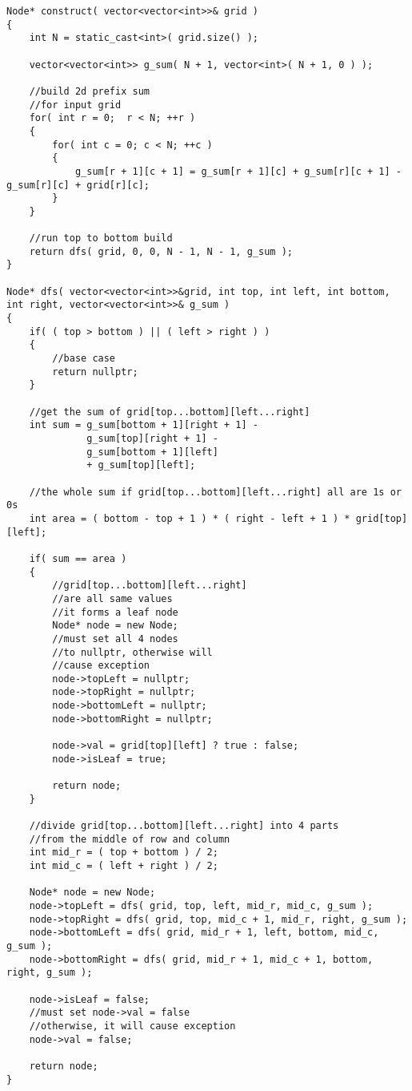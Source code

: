 \setcounter{lstlisting}{0}
\begin{lstlisting}[style=customc, caption={Build From Top To Bottom}]
Node* construct( vector<vector<int>>& grid )
{
    int N = static_cast<int>( grid.size() );

    vector<vector<int>> g_sum( N + 1, vector<int>( N + 1, 0 ) );

    //build 2d prefix sum
    //for input grid
    for( int r = 0;  r < N; ++r )
    {
        for( int c = 0; c < N; ++c )
        {
            g_sum[r + 1][c + 1] = g_sum[r + 1][c] + g_sum[r][c + 1] - g_sum[r][c] + grid[r][c];
        }
    }

    //run top to bottom build
    return dfs( grid, 0, 0, N - 1, N - 1, g_sum );
}

Node* dfs( vector<vector<int>>&grid, int top, int left, int bottom, int right, vector<vector<int>>& g_sum )
{
    if( ( top > bottom ) || ( left > right ) )
    {
        //base case
        return nullptr;
    }

    //get the sum of grid[top...bottom][left...right]
    int sum = g_sum[bottom + 1][right + 1] -
              g_sum[top][right + 1] -
              g_sum[bottom + 1][left]
              + g_sum[top][left];

    //the whole sum if grid[top...bottom][left...right] all are 1s or 0s
    int area = ( bottom - top + 1 ) * ( right - left + 1 ) * grid[top][left];

    if( sum == area )
    {
        //grid[top...bottom][left...right]
        //are all same values
        //it forms a leaf node
        Node* node = new Node;
        //must set all 4 nodes
        //to nullptr, otherwise will
        //cause exception
        node->topLeft = nullptr;
        node->topRight = nullptr;
        node->bottomLeft = nullptr;
        node->bottomRight = nullptr;

        node->val = grid[top][left] ? true : false;
        node->isLeaf = true;

        return node;
    }

    //divide grid[top...bottom][left...right] into 4 parts
    //from the middle of row and column
    int mid_r = ( top + bottom ) / 2;
    int mid_c = ( left + right ) / 2;

    Node* node = new Node;
    node->topLeft = dfs( grid, top, left, mid_r, mid_c, g_sum );
    node->topRight = dfs( grid, top, mid_c + 1, mid_r, right, g_sum );
    node->bottomLeft = dfs( grid, mid_r + 1, left, bottom, mid_c, g_sum );
    node->bottomRight = dfs( grid, mid_r + 1, mid_c + 1, bottom, right, g_sum );

    node->isLeaf = false;
    //must set node->val = false
    //otherwise, it will cause exception
    node->val = false;

    return node;
}
\end{lstlisting}

